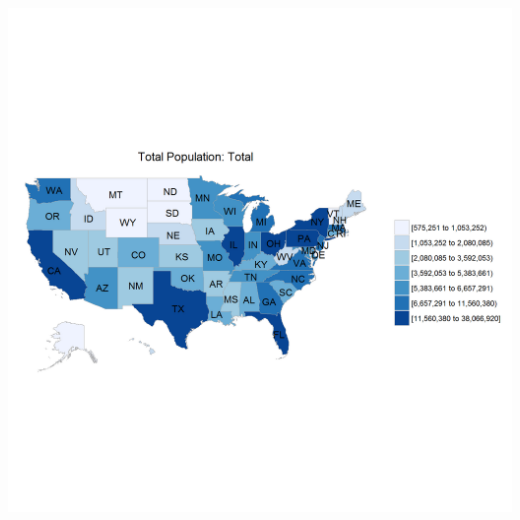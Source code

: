 \documentclass[]{article}
\begin{document}
\section{\texorpdfstring{\protect\includegraphics[height=12.50000in]{images/state_pop.png}}{US Population by State}}\label{us-population-by-state}
\end{document}

